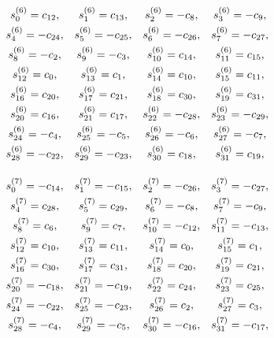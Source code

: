 \documentclass{jtacs}
\numberwithin{equation}{section}
\begin{document}
\begin{center}
\begin{adjustbox}{width=0.57\textwidth, margin=0 0 0 0}
$
\begin{array}{cccc}
\renewcommand*{\arraystretch}{1.5}
\begin{matrix}
s_{0}^{(6)}=c_{12}, & 	s_{1}^{(6)}=c_{13}, & 	s_{2}^{(6)}=-c_{8}, & 	s_{3}^{(6)}=-c_{9}, \\
s_{4}^{(6)}=-c_{24}, & 	s_{5}^{(6)}=-c_{25}, & 	s_{6}^{(6)}=-c_{26}, & 	      s_{7}^{(6)}=-c_{27}, \\
s_{8}^{(6)}=-c_{2}, & 	s_{9}^{(6)}=-c_{3}, & 	s_{10}^{(6)}=c_{14}, & 	s_{11}^{(6)}=c_{15}, \\ 	s_{12}^{(6)}=c_{0}, & 	s_{13}^{(6)}=c_{1}, & 	s_{14}^{(6)}=c_{10}, & 	s_{15}^{(6)}=c_{11}, \\
s_{16}^{(6)}=c_{20}, & 	s_{17}^{(6)}=c_{21}, & 	s_{18}^{(6)}=c_{30}, & 	s_{19}^{(6)}=c_{31}, \\ 	s_{20}^{(6)}=c_{16}, & 	s_{21}^{(6)}=c_{17}, & 	s_{22}^{(6)}=-c_{28}, & 	s_{23}^{(6)}=-c_{29}, \\
s_{24}^{(6)}=-c_{4}, & 	s_{25}^{(6)}=-c_{5}, & 	s_{26}^{(6)}=-c_{6}, & 	s_{27}^{(6)}=-c_{7}, \\
s_{28}^{(6)}=-c_{22}, & 	s_{29}^{(6)}=-c_{23}, & 	s_{30}^{(6)}=c_{18}, & 	s_{31}^{(6)}=c_{19}, \\
\end{matrix}
\end{array}
$
\end{adjustbox}
\end{center}

\begin{center}
\begin{adjustbox}{width=0.57\textwidth, margin=0 0 0 0}
$
\begin{array}{cccc}
\renewcommand*{\arraystretch}{1.5}
\begin{matrix}
s_{0}^{(7)}=-c_{14}, & 	s_{1}^{(7)}=-c_{15}, & 	s_{2}^{(7)}=-c_{26}, & 	s_{3}^{(7)}=-c_{27}, \\ 	s_{4}^{(7)}=c_{28}, & 	s_{5}^{(7)}=c_{29}, & 	s_{6}^{(7)}=-c_{8}, & 	s_{7}^{(7)}=-c_{9}, \\
s_{8}^{(7)}=c_{6}, & 	s_{9}^{(7)}=c_{7}, & 	s_{10}^{(7)}=-c_{12}, & 	s_{11}^{(7)}=-c_{13}, \\	s_{12}^{(7)}=c_{10}, & 	s_{13}^{(7)}=c_{11}, & 	s_{14}^{(7)}=c_{0}, & 	s_{15}^{(7)}=c_{1}, \\
s_{16}^{(7)}=c_{30}, & 	s_{17}^{(7)}=c_{31}, & 	s_{18}^{(7)}=c_{20}, & 	s_{19}^{(7)}=c_{21}, \\
s_{20}^{(7)}=-c_{18}, & 	s_{21}^{(7)}=-c_{19}, & 	s_{22}^{(7)}=c_{24}, & 	s_{23}^{(7)}=c_{25}, \\
s_{24}^{(7)}=-c_{22}, & 	s_{25}^{(7)}=-c_{23}, & 	s_{26}^{(7)}=c_{2}, & 	s_{27}^{(7)}=c_{3}, \\
s_{28}^{(7)}=-c_{4}, & 	s_{29}^{(7)}=-c_{5}, & 	s_{30}^{(7)}=-c_{16}, & 	s_{31}^{(7)}=-c_{17}, \\
\end{matrix}
\end{array}
$
\end{adjustbox}
\end{center}
\end{document}
